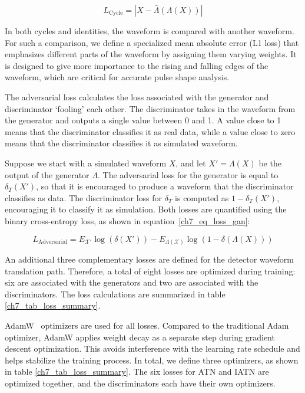 \begin{equation}\label{eq:loss_cyc}
    L_{\mathrm{Cycle}} = |X - \bar{\Lambda}(\Lambda(X))|
\end{equation}

In both cycles and identities, the waveform is compared with another waveform. For such a comparison, we define a specialized mean absolute error (L1 loss) that emphasizes different parts of the waveform by assigning them varying weights. It is designed to give more importance to the rising and falling edges of the waveform, which are critical for accurate pulse shape analysis.

The adversarial loss calculates the loss associated with the generator and discriminator `fooling' each other. The discriminator takes in the waveform from the generator and outputs a single value between 0 and 1. A value close to 1 means that the discriminator classifies it as real data, while a value close to zero means that the discriminator classifies it as simulated waveform. 

Suppose we start with a simulated waveform $X$, and let $X' = \Lambda(X)$ be the output of the generator $\Lambda$. The adversarial loss for the generator is equal to $\delta_T(X')$, so that it is encouraged to produce a waveform that the discriminator classifies as data. The discriminator loss for $\delta_T$ is computed as $1 - \delta_T(X')$, encouraging it to classify it as simulation. Both losses are quantified using the binary cross-entropy loss, as shown in equation~\ref{ch7_eq_loss_gan}:

\begin{equation}\label{ch7_eq_loss_gan}
    L_{\mathrm{Adversarial}} = E_{\mathcal{X'}}\log(\delta(X')) - E_{\Lambda(\mathcal{X})}\log(1 - \delta(\Lambda(X)))
\end{equation}

An additional three complementary losses are defined for the detector waveform translation path. Therefore, a total of eight losses are optimized during training: six are associated with the generators and two are associated with the discriminators. The loss calculations are summarized in table \ref{ch7_tab_loss_summary}.



AdamW~\cite{adam_w_paper} optimizers are used for all losses. Compared to the traditional Adam optimizer, AdamW applies weight decay as a separate step during gradient descent optimization. This avoids interference with the learning rate schedule and helps stabilize the training process. In total, we define three optimizers, as shown in table \ref{ch7_tab_loss_summary}. The six losses for ATN and IATN are optimized together, and the discriminators each have their own optimizers.

